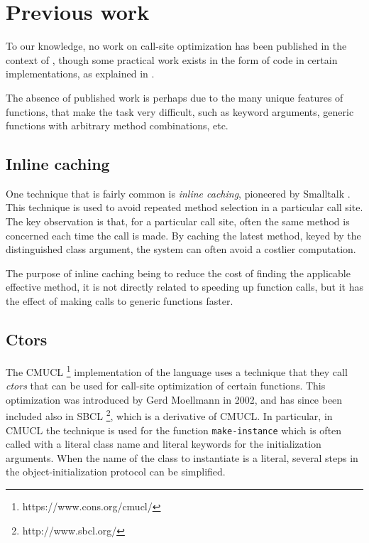 \section{Previous work}

To our knowledge, no work on call-site optimization has been published
in the context of \commonlisp{}, though some practical work exists in
the form of code in certain implementations, as explained in
.

The absence of published work is perhaps due to the many unique
features of \commonlisp{} functions, that make the task very
difficult, such as keyword arguments, generic functions with arbitrary
method combinations, etc.

\subsection{Inline caching}

One technique that is fairly common is \emph{inline caching},
pioneered by Smalltalk \cite{Deutsch:1984:ES}.  This technique is used
to avoid repeated method selection in a particular call site.  The key
observation is that, for a particular call site, often the same method
is concerned each time the call is made.  By caching the latest
method, keyed by the distinguished class argument, the system can
often avoid a costlier computation.

The purpose of inline caching being to reduce the cost of finding the
applicable effective method, it is not directly related to speeding up
function calls, but it has the effect of making calls to generic
functions faster.

\subsection{Ctors}
\label{sec-previous-ctors}

The CMUCL%
\footnote{https://www.cons.org/cmucl/}
implementation of the \commonlisp{} language uses a
technique that they call \emph{ctors} that can be used for call-site
optimization of certain functions.  This optimization was introduced
by Gerd Moellmann in 2002, and has since been included also in SBCL%
\footnote{http://www.sbcl.org/},
which is a derivative of CMUCL.  In particular, in CMUCL the technique
is used for the function \texttt{make-instance} which is often called
with a literal class name and literal keywords for the initialization
arguments.  When the name of the class to instantiate is a literal,
several steps in the object-initialization protocol can be simplified.

